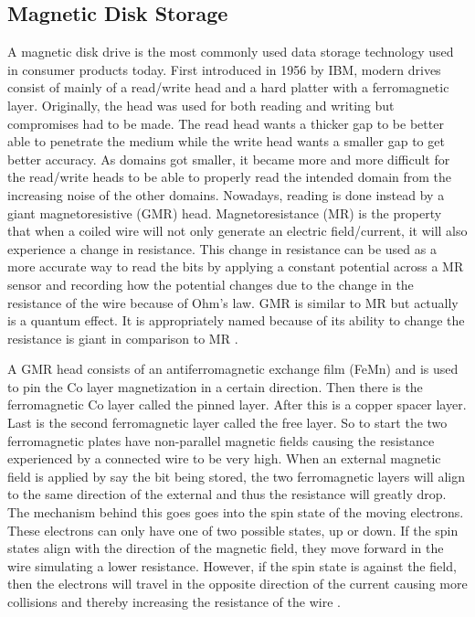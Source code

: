 \documentclass[ notitlepage, numerical, 11pt]{revtex4-1} %
\begin{document}
\subsection{Magnetic Disk Storage}
A magnetic disk drive is the most commonly used data storage technology used in consumer products today. First introduced in 1956 by IBM, modern drives consist of mainly of a read/write head and a hard platter with a ferromagnetic layer. Originally, the head was used for both reading and writing but compromises had to be made. The read head wants a thicker gap to be better able to penetrate the medium while the write head wants a smaller gap to get better accuracy. As domains got smaller, it became more and more difficult for the read/write heads to be able to properly read the intended domain from the increasing noise of the other domains. Nowadays, reading is done instead by a giant magnetoresistive (GMR) head. Magnetoresistance (MR) is the property that when a coiled wire will not only generate an electric field/current, it will also experience a change in resistance. This change in resistance can be used as a more accurate way to read the bits by applying a constant potential across a MR sensor and recording how the potential changes due to the change in the resistance of the wire because of Ohm's law. GMR is similar to MR but actually is a quantum effect. It is appropriately named because of its ability to change the resistance is giant in comparison to MR \cite{highDensity}. 


A GMR head consists of an antiferromagnetic exchange film (FeMn) and is used to pin the Co layer magnetization in a certain direction. Then there is the ferromagnetic Co layer called the pinned layer. After this is a copper spacer layer. Last is the second ferromagnetic layer called the free layer. So to start the two ferromagnetic plates have non-parallel magnetic fields causing the resistance experienced by a connected wire to be very high. When an external magnetic field is applied by say the bit being stored, the two ferromagnetic layers will align to the same direction of the external and thus the resistance will greatly drop. The mechanism behind this goes goes into the spin state of the moving electrons. These electrons can only have one of two possible states, up or down. If the spin states align with the direction of the magnetic field, they move forward in the wire simulating a lower resistance. However, if the spin state is against the field, then the electrons will travel in the opposite direction of the current causing more collisions and thereby increasing the resistance of the wire \cite{highDensity}.
\end{document}
